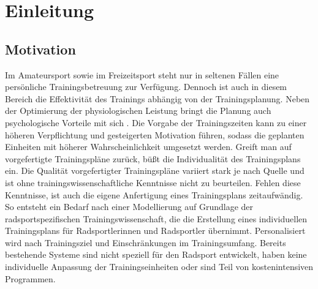 \chapter{Einleitung}
\label{sec:einleitung}
\section{Motivation}
Im Amateursport sowie im Freizeitsport steht nur in seltenen Fällen eine persönliche Trainingsbetreuung zur Verfügung. Dennoch ist auch in diesem Bereich die Effektivität des Trainings abhängig von der Trainingsplanung. Neben der Optimierung der physiologischen Leistung bringt die Planung auch psychologische Vorteile mit sich \cite{ImplementationIntentions}. Die Vorgabe der Trainingszeiten kann zu einer höheren Verpflichtung und gesteigerten Motivation führen, sodass die geplanten Einheiten mit höherer Wahrscheinlichkeit umgesetzt werden.
Greift man auf vorgefertigte Trainingspläne zurück, büßt die Individualität des Trainingsplans ein. Die Qualität vorgefertigter Trainingspläne variiert stark je nach Quelle und ist ohne trainingswissenschaftliche Kenntnisse nicht zu beurteilen. Fehlen diese Kenntnisse, ist auch die eigene Anfertigung eines Trainingsplans zeitaufwändig. 
So entsteht ein Bedarf nach einer Modellierung auf Grundlage der radsportspezifischen Trainingswissenschaft, die die Erstellung eines individuellen Trainingsplans für Radsportlerinnen und Radsportler übernimmt. Personalisiert wird nach Trainingsziel und Einschränkungen im Trainingsumfang. 
Bereits bestehende Systeme sind nicht speziell für den Radsport entwickelt, haben keine individuelle Anpassung der Trainingseinheiten oder sind Teil von kostenintensiven Programmen.

